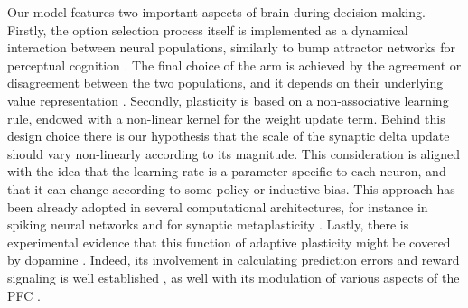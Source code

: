 Our model features two important aspects of brain during decision making. Firstly, the option selection process itself is implemented as a dynamical interaction between neural populations, similarly to bump attractor networks for perceptual cognition \cite{carrollEncodingCertaintyBump2014, esnaola-acebesBumpAttractorDynamics2021}.
The final choice of the arm is achieved by the agreement or disagreement between the two populations, and it depends on their underlying value representation \cite{bariDynamicDecisionMaking2021, houstonMatchingBehavioursRewards2021}.
Secondly, plasticity is based on a non-associative learning rule, endowed with a non-linear kernel for the weight update term.
Behind this design choice there is our hypothesis that the scale of the synaptic delta update should vary non-linearly according to its magnitude.
This consideration is aligned with the idea that the learning rate is a parameter specific to each neuron, and that it can change according to some policy or inductive bias.
This approach has been already adopted in several computational architectures, for instance in spiking neural networks \cite{inglisModulationDopamineAdaptive2021} and for synaptic metaplasticity \cite{iigayaAdaptiveLearningDecisionmaking2016}.
Lastly, there is experimental evidence that this function of adaptive plasticity might be covered by dopamine \cite{toblerAdaptiveCodingReward2005}.
Indeed, its involvement in calculating prediction errors and reward signaling is well established \cite{schultzNeuralSubstratePrediction1997}, as well with its modulation of various aspects of the PFC \cite{didomenicoDopaminergicModulationPrefrontal2023, lohaniDopamineModulationPrefrontal2019, dardenneRolePrefrontalCortex2012}. 
